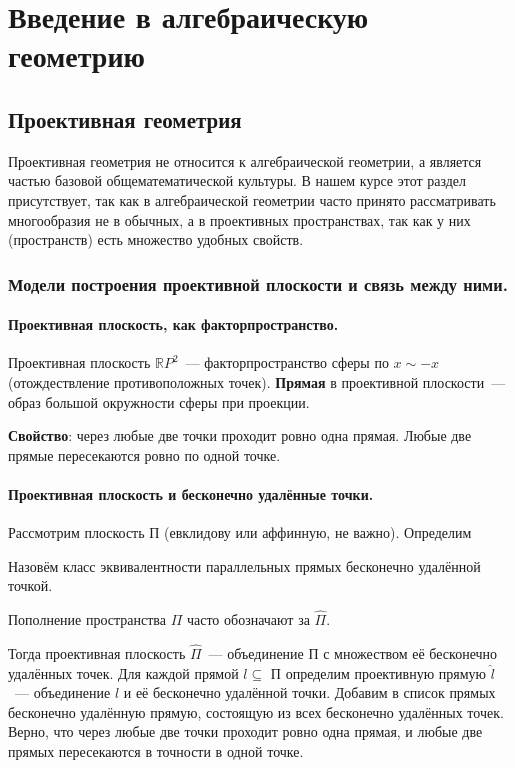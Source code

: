 \documentclass[11pt]{report}
\begin{document}
    \chapter{Введение в алгебраическую геометрию}
    \section{Проективная геометрия}
    Проективная геометрия не относится к алгебраической геометрии, а является частью базовой общематематической культуры.
    В нашем курсе этот раздел присутствует, так как в алгебраической геометрии часто принято рассматривать многообразия не в обычных, а в проективных пространствах, так как
    у них (пространств) есть множество удобных свойств.
    \subsection{Модели построения проективной плоскости и связь между ними.}
    \subsubsection*{Проективная плоскость, как факторпространство.}
    \begin{definition}
        Проективная плоскость $\mathbb{R}P^2$~--- факторпространство сферы по $x \sim -x$ (отождествление противоположных точек). \textbf{Прямая} в проективной плоскости~--- образ большой окружности сферы при проекции.
    \end{definition}

    \textbf{Свойство}: через любые две точки проходит ровно одна прямая. Любые две прямые пересекаются ровно по одной точке.

    \subsubsection*{Проективная плоскость и бесконечно удалённые точки.}

    Рассмотрим плоскость П (евклидову или аффинную, не важно). Определим
    \begin{definition}
        Назовём класс эквивалентности параллельных прямых бесконечно удалённой точкой.
    \end{definition}
    \begin{remark}
        Пополнение пространства $\Pi$ часто обозначают за $\widehat{\Pi}$.
    \end{remark}
    Тогда проективная плоскость $\widehat{\Pi}$~--- объединение П с множеством её бесконечно удалённых точек. Для каждой прямой $l \subseteq$ П определим проективную прямую $\hat{l}$~--- объединение $l$ и её бесконечно удалённой точки. Добавим в список прямых бесконечно удалённую прямую, состоящую из всех бесконечно удалённых точек.\\
    Верно, что через любые две точки проходит ровно одна прямая, и любые две прямых пересекаются в точности в одной точке.
\end{document}
